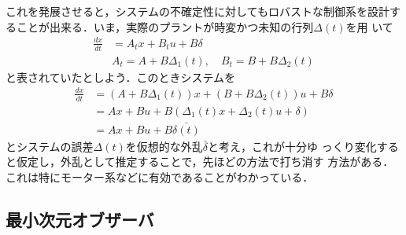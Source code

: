 これを発展させると，システムの不確定性に対してもロバストな制御系を設計す
ることが出来る．いま，実際のプラントが時変かつ未知の行列$\Delta(t)$を用
いて
\begin{align}
  \frac{dx}{dt} & = A_t x + B_t u + B \delta 
\\
  & A_t = A + B \Delta_1(t), \quad B_t = B + B\Delta_2(t)
\nonumber 
\end{align}
と表されていたとしよう．このときシステムを
\begin{align}
 \frac{dx}{dt}
  &= (A + B \Delta_1(t))x + (B + B\Delta_2(t)) u + B \delta \nonumber \\
 &= A x + B u + B (\Delta_1(t) x + \Delta_2(t) u +\delta) \nonumber \\
 &= Ax + Bu + B \bar{\delta(t)}
\end{align}
とシステムの誤差$\Delta(t)$を仮想的な外乱$\bar{\delta}$と考え，これが十分ゆ
っくり変化すると仮定し，外乱として推定することで，先ほどの方法で打ち消す
方法がある．これは特にモーター系などに有効であることがわかっている．




\subsection{最小次元オブザーバ}

